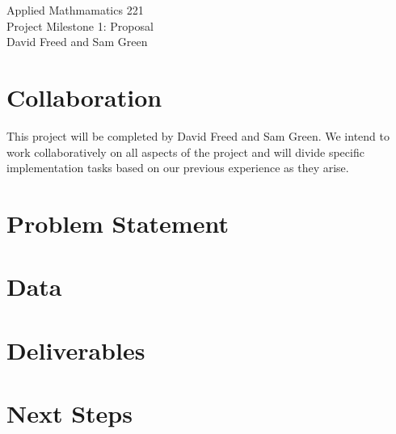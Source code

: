 \documentclass[12pt]{article}
\begin{document}
\begin{center}
Applied Mathmamatics 221\\
Project Milestone 1: Proposal\\
David Freed and Sam Green
\end{center}

\section{Collaboration}

This project will be completed by David Freed and Sam Green. We intend to work collaboratively on all aspects of the project and will divide specific implementation tasks based on our previous experience as they arise.

\section{Problem Statement}



\section{Data}

\section{Deliverables}

\section{Next Steps}
\end{document}
